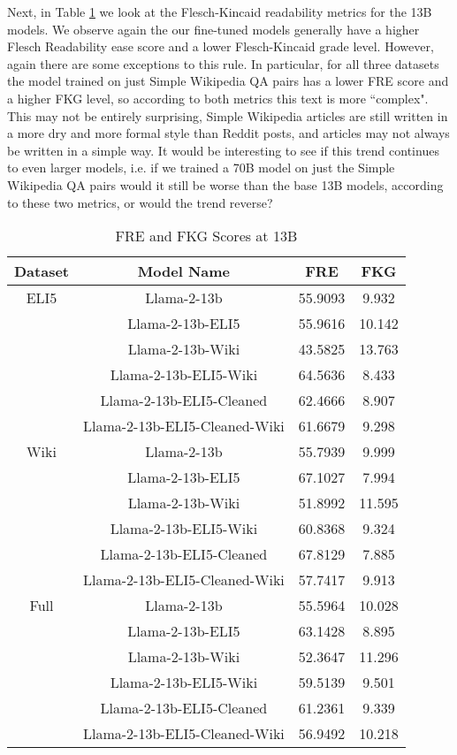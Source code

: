 \documentclass[11pt, oneside]{article}   	%
\begin{document}
Next, in Table \ref{tab:FRE_FKG_13B} we look at the Flesch-Kincaid readability metrics for the 13B models. 
We observe again the our fine-tuned models generally have a higher Flesch Readability ease score and a lower Flesch-Kincaid grade level.
However, again there are some exceptions to this rule.
In particular, for all three datasets the model trained on just Simple Wikipedia QA pairs has a lower FRE score and a higher FKG level, so according to both metrics this text is more ``complex".
This may not be entirely surprising, Simple Wikipedia articles are still written in a more dry and more formal style than Reddit posts, and articles may not always be written in a simple way. 
It would be interesting to see if this trend continues to even larger models, i.e. if we trained a 70B model on just the Simple Wikipedia QA pairs would it still be worse than the base 13B models, according to these two metrics, or would the trend reverse?



\begin{table}[h]
\centering
\begin{tabular}{cccc}
\toprule
Dataset & Model Name & FRE & FKG \\
\midrule
ELI5 & Llama-2-13b & 55.9093 & 9.932 \\
 & Llama-2-13b-ELI5 & 55.9616 & 10.142 \\
 & Llama-2-13b-Wiki & 43.5825 & 13.763 \\
  & Llama-2-13b-ELI5-Wiki & 64.5636 & 8.433 \\
 & Llama-2-13b-ELI5-Cleaned & 62.4666 & 8.907 \\
 & Llama-2-13b-ELI5-Cleaned-Wiki & 61.6679 & 9.298 \\
\midrule
Wiki & Llama-2-13b & 55.7939 & 9.999 \\
 & Llama-2-13b-ELI5 & 67.1027 & 7.994 \\
 & Llama-2-13b-Wiki & 51.8992 & 11.595 \\
  & Llama-2-13b-ELI5-Wiki & 60.8368 & 9.324 \\
 & Llama-2-13b-ELI5-Cleaned & 67.8129 & 7.885 \\
 & Llama-2-13b-ELI5-Cleaned-Wiki & 57.7417 & 9.913 \\
 \midrule
Full & Llama-2-13b & 55.5964 & 10.028 \\
 & Llama-2-13b-ELI5 & 63.1428 & 8.895 \\
 & Llama-2-13b-Wiki & 52.3647 & 11.296 \\
  & Llama-2-13b-ELI5-Wiki & 59.5139 & 9.501 \\
 & Llama-2-13b-ELI5-Cleaned & 61.2361 & 9.339 \\
 & Llama-2-13b-ELI5-Cleaned-Wiki & 56.9492 & 10.218 \\
\bottomrule
\end{tabular}
\caption{FRE and FKG Scores at 13B}
\label{tab:FRE_FKG_13B}
\end{table}
\end{document}
